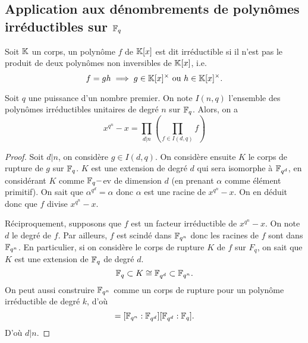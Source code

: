 \documentclass[../main.tex]{subfiles}
\begin{document}
\subsection*{Application aux dénombrements de polynômes irréductibles sur \(\mathbb{F}_q\)}
\begin{definition} Soit \(\mathbb{K}\) un corps, un polynôme \(f\) de \(\mathbb{K}[x]\) est dit irréductible si
    il n'est pas le produit de deux polynômes non inversibles de \(\mathbb{K}[x]\), i.e.
\begin{equation}
    f = gh \implies g\in  \mathbb{K}[x]^\times\text{ ou } h\in \mathbb{K}[x]^\times.
\end{equation}
\end{definition}
\begin{proposition}\label{prodirr} Soit \(q\) une puissance d'un nombre premier. On note \(I(n,q)\) 
    l'ensemble des polynômes irréductibles unitaires de degré \(n\) sur \(\mathbb{F}_q\). Alors, on a 
    \begin{equation}
        x^{q^n} - x = \prod_{d|n}\left(\prod_{f\in I(d,q)}f\right)
    \end{equation}
\end{proposition}
\begin{proof}
    Soit \(d|n\), on considère \(g \in I(d,q)\). On considère ensuite \(K\) le corps
    de rupture de \(g\) sur \(\mathbb{F}_q\). \(K\) est une extension de degré \(d\) qui sera isomorphe
    à \(\mathbb{F}_{q^d}\), en considérant \(K\) comme \(\mathbb{F}_q-\)ev de dimension \(d\) (en prenant \(\alpha\) comme élément primitif).
    On sait que \(\alpha^{q^d} = \alpha\) donc \(\alpha\) est une racine de \(x^{q^n}-x\). 
    On en déduit donc que \(f\) divise \(x^{q^n} - x\).

    Réciproquement, supposons que \(f\) est un facteur irréductible de \(x^{q^n} - x\).
    On note \(d\) le degré de \(f\). Par ailleurs, \(f\) est scindé dans \(\mathbb{F}_{q^n}\) donc les racines de \(f\) sont dans \(\mathbb{F}_{q^n}\).
    En particulier, si on considère le corps de rupture \(K\) de \(f\) sur \(F_q\), on sait que \(K\) est une extension de \(\mathbb{F}_q\) de degré \(d\).
    \begin{equation}
        \mathbb{F}_q \subset K\cong \mathbb{F}_{q^d} \subset \mathbb{F}_{q^n}.
    \end{equation}
    On peut aussi construire \(\mathbb{F}_{q^n}\) comme un corps de rupture pour un polynôme irréductible de degré \(k\), d'où
    \begin{equation}
        [\F_{q^n}:\F_q] = [\F_{q^n}:\F_{q^d}][\F_{q^d}:\F_q].
    \end{equation}
    D'où \(d|n\).
\end{proof}
\end{document}
